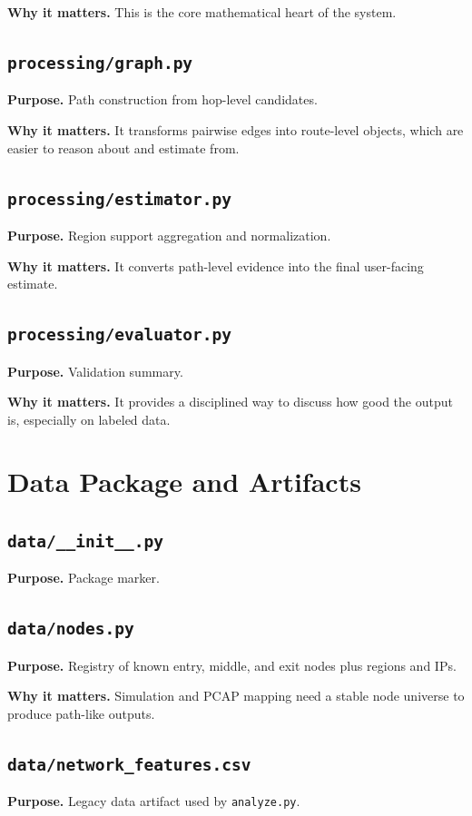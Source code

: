 \documentclass[12pt,a4paper]{report}
\begin{document}
\textbf{Why it matters.} This is the core mathematical heart of the system.

\section{\texttt{processing/graph.py}}
\textbf{Purpose.} Path construction from hop-level candidates.

\textbf{Why it matters.} It transforms pairwise edges into route-level objects, which are easier to reason about and estimate from.

\section{\texttt{processing/estimator.py}}
\textbf{Purpose.} Region support aggregation and normalization.

\textbf{Why it matters.} It converts path-level evidence into the final user-facing estimate.

\section{\texttt{processing/evaluator.py}}
\textbf{Purpose.} Validation summary.

\textbf{Why it matters.} It provides a disciplined way to discuss how good the output is, especially on labeled data.

\chapter{Data Package and Artifacts}
\section{\texttt{data/\_\_init\_\_.py}}
\textbf{Purpose.} Package marker.

\section{\texttt{data/nodes.py}}
\textbf{Purpose.} Registry of known entry, middle, and exit nodes plus regions and IPs.

\textbf{Why it matters.} Simulation and PCAP mapping need a stable node universe to produce path-like outputs.

\section{\texttt{data/network\_features.csv}}
\textbf{Purpose.} Legacy data artifact used by \texttt{analyze.py}.
\end{document}
